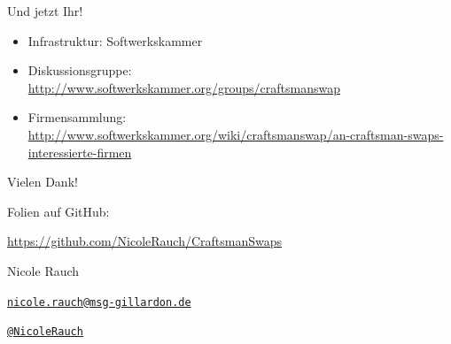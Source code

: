 \begin{frame}{Und jetzt Ihr!}

\begin{itemize}

\item Infrastruktur: Softwerkskammer

\item Diskussionsgruppe: \\ \url{http://www.softwerkskammer.org/groups/craftsmanswap}

\item Firmensammlung: \\ \url{http://www.softwerkskammer.org/wiki/craftsmanswap/an-craftsman-swaps-interessierte-firmen}

\end{itemize}

\end{frame}

{
\begin{frame}{Vielen Dank!}

        Folien auf GitHub:
        \vspace{-0.8em}
        \begin{center}
                \url{https://github.com/NicoleRauch/CraftsmanSwaps}
        \end{center}

        \begin{block}{Nicole Rauch}
        \begin{description}[Twitterxx]
                \item[E-Mail]  \href{mailto:nicole.rauch@msg-gillardon.de}{\texttt{nicole.rauch@msg-gillardon.de}}
                \item[Twitter] \href{http://twitter.com/NicoleRauch}{\texttt{@NicoleRauch}}
        \end{description}
        \end{block}
\end{frame}
}
